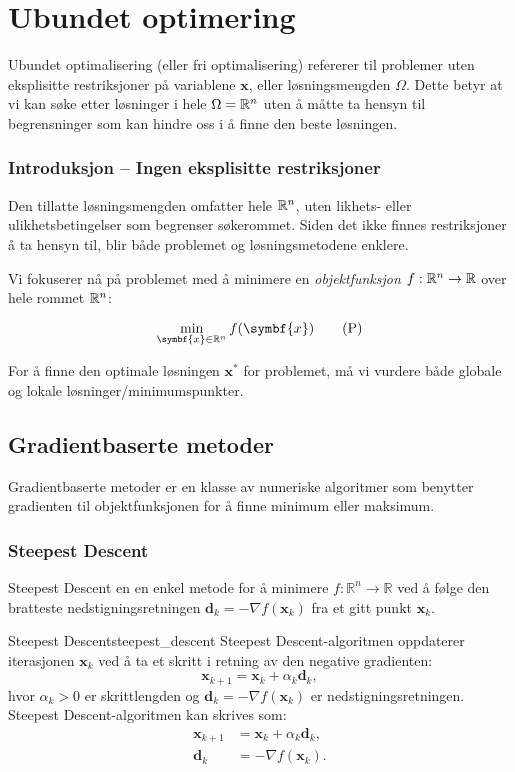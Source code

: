 \part{Ubundet optimering}
\label{part:unconstrained_optimization}

Ubundet optimalisering (eller fri optimalisering) refererer til problemer uten eksplisitte restriksjoner på variablene \(\symbf{x}\), eller løsningsmengden \(\Omega\).
Dette betyr at vi kan søke etter løsninger i hele \(\Omega = \mathbb{R}^n\) uten å måtte ta hensyn til begrensninger som kan hindre oss i å finne den beste løsningen.

\section{Introduksjon -- Ingen eksplisitte restriksjoner}
Den tillatte løsningsmengden omfatter hele \(\mathbb{R}^n\), uten likhets- eller ulikhetsbetingelser som begrenser søkerommet.
Siden det ikke finnes restriksjoner å ta hensyn til, blir både problemet og løsningsmetodene enklere.

Vi fokuserer nå på problemet med å minimere en \textit{objektfunksjon} \( f : \mathbb{R}^n \to \mathbb{R} \) over hele rommet \(\mathbb{R}^n\):

\[
	\min_{\symbf{x} \in \R^n} f(\symbf{x}) \tag{P} \label{eq:global_minimization_problem}
\]

For å finne den optimale løsningen \(\symbf{x}^\ast\) for problemet, må vi vurdere både globale og lokale løsninger/minimumspunkter.

\chapter{Gradientbaserte metoder}\label{chap:gradient_based_methods}
Gradientbaserte metoder er en klasse av numeriske algoritmer som benytter gradienten til objektfunksjonen for å finne minimum eller maksimum.

\section{Steepest Descent}\label{sec:steepest_descent}
Steepest Descent en en enkel metode for å minimere \(f: \mathbb{R}^n \to \mathbb{R}\) ved å følge den bratteste nedstigningsretningen \( \symbf{d}_k = -\nabla f(\symbf{x}_k)\) fra et gitt punkt \( \symbf{x}_k \).
\begin{definition}{Steepest Descent}{steepest_descent}
	Steepest Descent-algoritmen oppdaterer iterasjonen \( \symbf{x}_k \) ved å ta et skritt i retning av den negative gradienten:
	\[
		\symbf{x}_{k+1} = \symbf{x}_k + \alpha_k \symbf{d}_k,
	\]
	hvor \( \alpha_k > 0 \) er skrittlengden og \( \symbf{d}_k = -\nabla f(\symbf{x}_k) \) er nedstigningsretningen.
	\medskip
	Steepest Descent-algoritmen kan skrives som:
	\begin{align*}
		\symbf{x}_{k+1} & = \symbf{x}_k + \alpha_k \symbf{d}_k, \\
		\symbf{d}_k     & = -\nabla f(\symbf{x}_k).
	\end{align*}

\end{definition}

